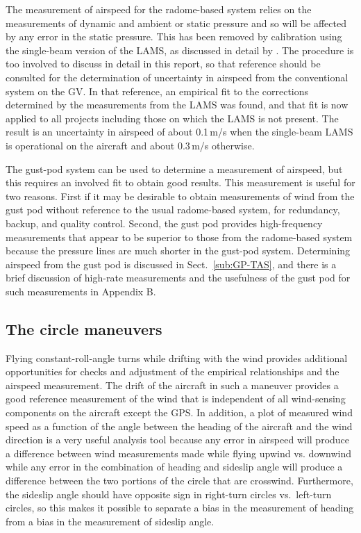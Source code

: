 \documentclass[12pt,twoside,english]{article}\usepackage[]{graphicx}\usepackage[]{color}
\let\OrgIndex\index
\renewcommand*{\index}[1]{\OrgIndex{#1}}
\begin{document}
The measurement of airspeed for the radome-based system relies on the measurements of dynamic and ambient or static pressure and so will be affected by any error in the static pressure. This has been removed by calibration using the single-beam version of the LAMS, as discussed in detail by \citet{CooperEtAl2014}. The procedure is too involved to discuss in detail in this report, so that reference should be consulted for the determination of uncertainty in airspeed from the conventional system on the GV\@. In that reference, an empirical fit to the corrections determined by the measurements from the LAMS was found, and that fit is now applied to all projects including those on which the LAMS is not present. The result is an uncertainty in airspeed of about 0.1\,m/s when the single-beam LAMS is operational on the aircraft and about 0.3\,m/s otherwise. 

The gust-pod system can be used to determine a measurement of airspeed, but this requires an involved fit to obtain good results. This measurement is useful for two reasons. First if it may be desirable to obtain measurements of wind from the gust pod without reference to the usual radome-based system, for redundancy, backup, and quality control. Second, the gust pod provides high-frequency measurements that appear to be superior to those from the radome-based system because the pressure lines are much shorter in the gust-pod system. Determining airspeed from the gust pod is discussed in Sect.~\ref{sub:GP-TAS}, and there is a brief discussion of high-rate measurements and the usefulness of the gust pod for such measurements in Appendix B. 

\subsection{The circle maneuvers\label{sub:circle-summary}}

Flying constant-roll-angle turns while drifting with the wind provides additional  opportunities for checks and adjustment of the empirical relationships and the airspeed measurement. The drift of the aircraft in such a maneuver provides a good reference measurement of the wind that is independent of all wind-sensing components on the aircraft except the GPS. In addition, a plot of measured wind speed as a function of the angle between the heading of the aircraft and the wind direction is a very useful analysis tool because any error in airspeed will produce a difference between wind measurements made while flying upwind vs\@. downwind while any error in the combination of heading and sideslip angle will produce a difference between the two portions of the circle that are crosswind. Furthermore, the sideslip angle should have opposite sign in right-turn circles vs.~left-turn circles, so this makes it possible to separate a bias in the measurement of heading from a bias in the measurement of sideslip angle. 
\end{document}
